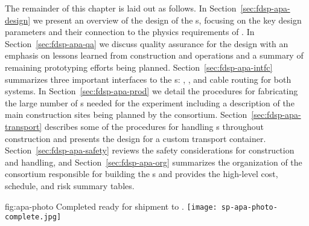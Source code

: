 The remainder of this chapter is laid out as follows.  In Section~\ref{sec:fdsp-apa-design} we present an overview of the design of the s, focusing on the key design parameters and their connection to the physics requirements of .  In Section~\ref{sec:fdsp-apa-qa} we discuss quality assurance for the design with an emphasis on lessons learned from  construction and operations and a summary of remaining prototyping efforts being planned. Section~\ref{sec:fdsp-apa-intfc} summarizes three important interfaces to the s:  , , and cable routing for both systems.  In Section~\ref{sec:fdsp-apa-prod} we detail the procedures for fabricating the large number of s needed for the experiment including a description of the main construction sites being planned by the  consortium.  Section~\ref{sec:fdsp-apa-transport} describes some of the procedures for handling s throughout construction and presents the design for a custom transport container. Section~\ref{sec:fdsp-apa-safety} reviews the safety considerations for  construction and handling, and Section~\ref{sec:fdsp-apa-org} summarizes the organization of the  consortium responsible for building the s and provides the high-level cost, schedule, and risk summary tables. 

\begin{dunefigure}{fig:apa-photo}
{Completed   ready for shipment to .}
\texttt{[image: sp-apa-photo-complete.jpg]}
\end{dunefigure}
